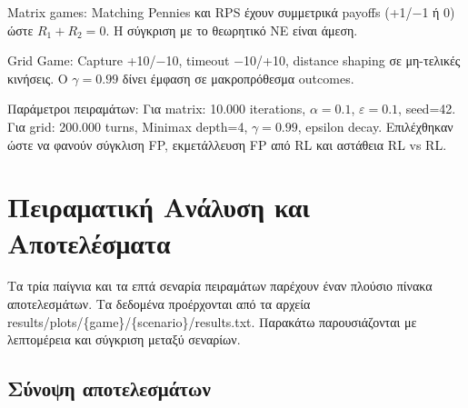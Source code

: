 \documentclass[11pt,a4paper]{article}
\newcommand{\eng}[1]{\foreignlanguage{english}{#1}}
\begin{document}
Matrix games: Matching Pennies και RPS έχουν συμμετρικά payoffs (+1/−1 ή 0) ώστε \(R_1+R_2=0\). Η σύγκριση με το θεωρητικό NE είναι άμεση.

Grid Game: Capture +10/−10, timeout −10/+10, distance shaping σε μη-τελικές κινήσεις. Ο \(\gamma=0.99\) δίνει έμφαση σε μακροπρόθεσμα outcomes.

Παράμετροι πειραμάτων: Για matrix: 10.000 iterations, \(\alpha=0.1\), \(\varepsilon=0.1\), seed=42. Για grid: 200.000 turns, Minimax depth=4, \(\gamma=0.99\), epsilon decay. Επιλέχθηκαν ώστε να φανούν σύγκλιση FP, εκμετάλλευση FP από RL και αστάθεια RL vs RL.

\section{Πειραματική Ανάλυση και Αποτελέσματα}

Τα τρία παίγνια και τα επτά σεναρία πειραμάτων παρέχουν έναν πλούσιο πίνακα αποτελεσμάτων. Τα δεδομένα προέρχονται από τα αρχεία \eng{results/plots/\{game\}/\{scenario\}/results.txt}. Παρακάτω παρουσιάζονται με λεπτομέρεια και σύγκριση μεταξύ σεναρίων.

\subsection{Σύνοψη αποτελεσμάτων}

\begin{center}
\small
{}
\end{center}
\end{document}

